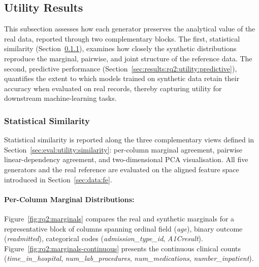 \subsection{Utility Results}
\label{sec:results:rq2:utility}

This subsection assesses how each generator preserves the
analytical value of the real data, reported through two complementary
blocks. The first, statistical similarity
(Section~\ref{sec:results:rq2:utility:similarity}), examines how closely
the synthetic distributions reproduce the marginal, pairwise, and joint
structure of the reference data. The second, predictive performance
(Section~\ref{sec:results:rq2:utility:predictive}), quantifies the extent
to which models trained on synthetic data retain their accuracy when
evaluated on real records, thereby capturing utility for downstream
machine-learning tasks.


\subsubsection{Statistical Similarity}
\label{sec:results:rq2:utility:similarity}

Statistical similarity is reported along the three complementary views
defined in Section~\ref{sec:eval:utility:similarity}: per-column marginal
agreement, pairwise linear-dependency agreement, and two-dimensional PCA visualisation. 
All five generators and the real reference are
evaluated on the aligned feature space introduced in
Section~\ref{sec:data:fe}.

\paragraph{Per-Column Marginal Distributions:}
Figure~\ref{fig:rq2:marginals}  compares the real and synthetic marginals
for a representative block of columns spanning ordinal field
(\emph{age}), binary outcome (\emph{readmitted}), categorical codes
(\emph{admission\_\allowbreak type\_\allowbreak id}, \emph{A1Cresult}). 
Figure~\ref{fig:rq2:marginals-continuous} presents the continuous clinical
counts (\emph{time\_\allowbreak in\_\allowbreak hospital},
\emph{num\_\allowbreak lab\_\allowbreak procedures},
\emph{num\_\allowbreak medications},
\emph{number\_\allowbreak inpatient}). 

